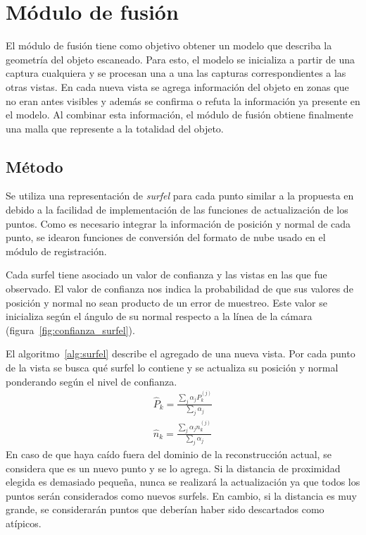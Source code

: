\section{Módulo de fusión}
	El módulo de fusión tiene como objetivo obtener un modelo que
	describa la geometría del objeto escaneado.
	Para esto, el modelo se inicializa a partir de una captura cualquiera
	y se procesan una a una las capturas correspondientes a las otras vistas.
	En cada nueva vista se agrega información del objeto en zonas que no eran antes visibles
	y además se confirma o refuta la información ya presente en el modelo.
	Al combinar esta información, el módulo de fusión obtiene finalmente una malla
	que represente a la totalidad del objeto.

	\subsection{Método}
	Se utiliza una representación de \emph{surfel} para cada punto similar a la propuesta en \cite{5457479} %
	debido a la facilidad de implementación de las funciones de actualización de los puntos.
	Como es necesario integrar la información de posición y normal de cada punto,
	se idearon funciones de conversión del formato de nube usado en el módulo de registración.

	Cada surfel tiene asociado un valor de confianza y las vistas en las que
	fue observado.  El valor de confianza nos indica la probabilidad de que sus
	valores de posición y normal no sean producto de un error de muestreo.
	Este valor se inicializa según el ángulo de su normal respecto a la línea
	de la cámara (figura~\ref{fig:confianza_surfel}).

	El algoritmo~\ref{alg:surfel} describe el agregado de una nueva vista.
	Por cada punto de la vista se busca qué surfel lo contiene y se actualiza
	su posición y normal ponderando según el nivel de confianza.
	\begin{eqnarray*}
		\hat{P}_k = \frac{\sum_{j} \alpha_j P^{(j)}_k}{\sum_{j} \alpha_j} \\
		\hat{n}_k = \frac{\sum_{j} \alpha_j n^{(j)}_k}{\sum_{j} \alpha_j}
	\end{eqnarray*}
	En caso de que haya caído fuera del dominio de la reconstrucción actual, se
	considera que es un nuevo punto y se lo agrega.
	Si la distancia de proximidad elegida es demasiado pequeña,
	nunca se realizará la actualización ya que todos los puntos serán considerados como nuevos surfels.
	En cambio, si la distancia es muy grande, se considerarán puntos
	que deberían haber sido descartados como atípicos.


